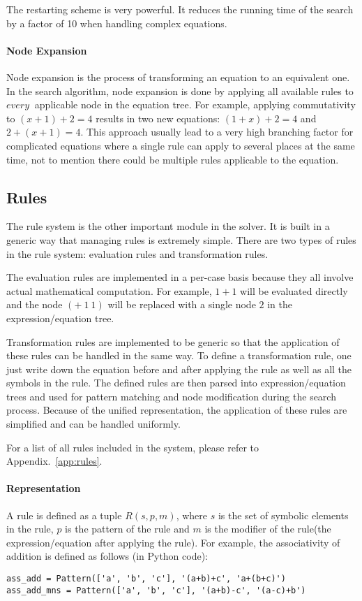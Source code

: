 \documentclass{article}
\begin{document}
The restarting scheme is very powerful. It reduces the running time of the search by a factor of 10 when handling complex equations.

\paragraph{Node Expansion} Node expansion is the process of transforming an equation to an equivalent one. In the search algorithm, node expansion is done by applying all available rules to $every~$ applicable node in the equation tree. For example, applying commutativity to $(x+1)+2=4$ results in two new equations: $(1+x)+2=4$ and $2+(x+1)=4$. This approach usually lead to a very high branching factor for complicated equations where a single rule can apply to several places at the same time, not to mention there could be multiple rules applicable to the equation.

\subsection{Rules}
The rule system is the other important module in the solver. It is built in a generic way that managing rules is extremely simple. There are two types of rules in the rule system: evaluation rules and transformation rules. 

The evaluation rules are implemented in a per-case basis because they all involve actual mathematical computation. For example, $1+1$ will be evaluated directly and the node $(+~1~1)$ will be replaced with a single node $2$ in the expression/equation tree.

Transformation rules are implemented to be generic so that the application of these rules can be handled in the same way. To define a transformation rule, one just write down the equation before and after applying the rule as well as all the symbols in the rule. The defined rules are then parsed into expression/equation trees and used for pattern matching and node modification during the search process. Because of the unified representation, the application of these rules are simplified and can be handled uniformly.

For a list of all rules included in the system, please refer to Appendix.~\ref{app:rules}.

\paragraph{Representation}A rule is defined as a tuple $R(s, p, m)$, where $s$ is the set of symbolic elements in the rule, $p$ is the pattern of the rule and $m$ is the modifier of the rule(the expression/equation after applying the rule). For example, the associativity of addition is defined as follows (in Python code):
\begin{lstlisting}
ass_add = Pattern(['a', 'b', 'c'], '(a+b)+c', 'a+(b+c)')
ass_add_mns = Pattern(['a', 'b', 'c'], '(a+b)-c', '(a-c)+b')
\end{lstlisting}
\end{document}
